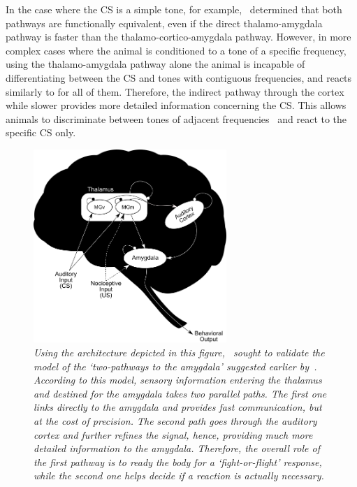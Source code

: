 In the case where the CS is a simple tone, for example,~\citet{Romanski1992} determined that both pathways are functionally equivalent, even if the direct thalamo-amygdala pathway is faster than the thalamo-cortico-amygdala pathway. However, in more complex cases where the animal is conditioned to a tone of a specific frequency, using the thalamo-amygdala pathway alone the animal is incapable of differentiating between the CS and tones with contiguous frequencies, and reacts similarly to for all of them. Therefore, the indirect pathway through the cortex while slower provides more detailed information concerning the CS\@. This allows animals to discriminate between tones of adjacent frequencies~\supercite{Romanski1992} and react to the specific CS only.

\begin{figure}[!htbp]
\centering
\includegraphics[width=0.65\textwidth]{Figs/armony}
\caption{\textit{Using the architecture depicted in this figure,~\citet{Armony1995} sought to validate the model of the `\emph{two-pathways to the amygdala}' suggested earlier by~\citet{Ledoux1992}. According to this model, sensory information entering the thalamus and destined for the amygdala takes two parallel paths. The first one links directly to the amygdala and provides fast communication, but at the cost of precision. The second path goes through the auditory cortex and further refines the signal, hence, providing much more detailed information to the amygdala. Therefore, the overall role of the first pathway is to ready the body for a `\emph{fight-or-flight}' response, while the second one helps decide if a reaction is actually necessary.}}\label{fig:armony}
\end{figure}

